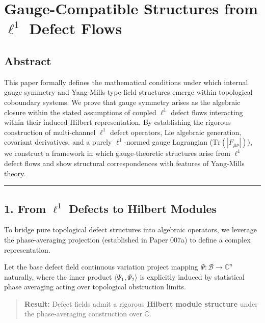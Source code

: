\documentclass[
]{article}
\author{}
\date{}
\begin{document}
\section{\texorpdfstring{Gauge-Compatible Structures from \(\ell^1\)
Defect
Flows}{Gauge-Compatible Structures from \textbackslash ell\^{}1 Defect Flows}}\label{gauge-compatible-structures-from-ell1-defect-flows}

\subsection{Abstract}\label{abstract}

This paper formally defines the mathematical conditions under which
internal gauge symmetry and Yang-Mills-type field structures emerge
within topological coboundary systems. We prove that gauge symmetry
arises as the algebraic closure within the stated assumptions of coupled
\(\ell^1\) defect flows interacting within their induced Hilbert
representation. By establishing the rigorous construction of
multi-channel \(\ell^1\) defect operators, Lie algebraic generation,
covariant derivatives, and a purely \(\ell^1\)-normed gauge Lagrangian
(\(\mathrm{Tr}(|F_{\mu\nu}|)\)), we construct a framework in which
gauge-theoretic structures arise from \(\ell^1\) defect flows and show
structural correspondences with features of Yang-Mills theory.

\begin{center}\rule{0.5\linewidth}{0.5pt}\end{center}

\subsection{\texorpdfstring{1. From \(\ell^1\) Defects to Hilbert
Modules}{1. From \textbackslash ell\^{}1 Defects to Hilbert Modules}}\label{from-ell1-defects-to-hilbert-modules}

To bridge pure topological defect structures into algebraic operators,
we leverage the phase-averaging projection (established in Paper 007a)
to define a complex representation.

Let the base defect field continuous variation project mapping
\(\Psi: \mathcal{B} \to \mathbb{C}^n\) naturally, where the inner
product \(\langle \Psi_1, \Psi_2 \rangle\) is explicitly induced by
statistical phase averaging acting over topological obstruction limits.

\begin{quote}
\textbf{Result:} Defect fields admit a rigorous \textbf{Hilbert module
structure} under the phase-averaging construction over \(\mathbb{C}\).
\end{quote}
\end{document}
